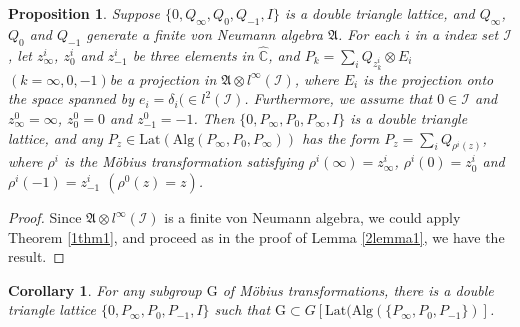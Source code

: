\documentclass{amsart}
\newcommand{\AAA}{\mathfrak A}
\newcommand{\Lat}{\mathrm{Lat}}
\newcommand{\Alg}{\mathrm{Alg}}
\newcommand{\C}{\mathbb C} %
\newtheorem{corollary}{Corollary}[section]
\newtheorem{prop}{Proposition}[section]
\begin{document}
\begin{prop}\label{2prop1}
Suppose $\{ 0, Q_{\infty}, Q_{0} ,Q_{-1}, I\}$ is a double triangle lattice, and 
$Q_{\infty}$, $Q_{0}$ and $Q_{-1}$ generate a finite von Neumann algebra $\AAA$.
For each $i$ in a index set $\mathcal{I}$, let $z^{i}_{\infty}$, $z_{0}^{i}$ and $z_{-1}^{i}$ be three elements
in $ \widehat{\C}$, and $P_{k} = \sum_{i} Q_{z^{i}_{k}} \otimes E_{i}$ $( k = \infty, 0, -1)$be a projection in 
$\AAA \otimes l^{\infty}(\mathcal{I})$, where $E_{i}$ is the projection onto the space
spanned by $e_{i} = \delta_{i} (\in l^{2}(\mathcal{I})$. Furthermore, we assume that $0 \in \mathcal{I}$ and $z^{0}_{\infty} = \infty$, $z_{0}^{0} =0$ and $z_{-1}^{0}= -1$. Then $\{0, P_{\infty}, P_{0}, P_{\infty}, I \}$ is
a double triangle lattice, and any $P_{z} \in \Lat(\Alg(P_{\infty}, P_{0}, P_{\infty}))$ has the form
$P_{z} = \sum_{i} Q_{\rho^{i}(z)}$, where $\rho^{i}$ is the M\"{o}bius transformation satisfying 
$\rho^{i}(\infty)= z^{i}_{\infty}$, $\rho^{i}(0) = z^{i}_{0}$ and $\rho^{i}(-1) = z^{i}_{-1}$ $(\rho^{0}(z) = z)$.
\end{prop}

\begin{proof}
Since $\AAA \otimes l^{\infty}(\mathcal{I})$ is a finite von Neumann algebra, we could apply 
Theorem \ref{1thm1}, and proceed as in the proof of Lemma \ref{2lemma1}, we have the result.
\end{proof}

\begin{corollary}\label{2cor3}
For any subgroup $\mathrm{G}$ of M\"{o}bius transformations, there is a double triangle 
lattice $\{0, P_{\infty}, P_{0}, P_{-1} , I \}$ such that $\mathrm{G} \subset G[\Lat(\Alg( \{ P_{\infty},  P_{0}, P_{-1} \})]$.
\end{corollary}
\end{document}
